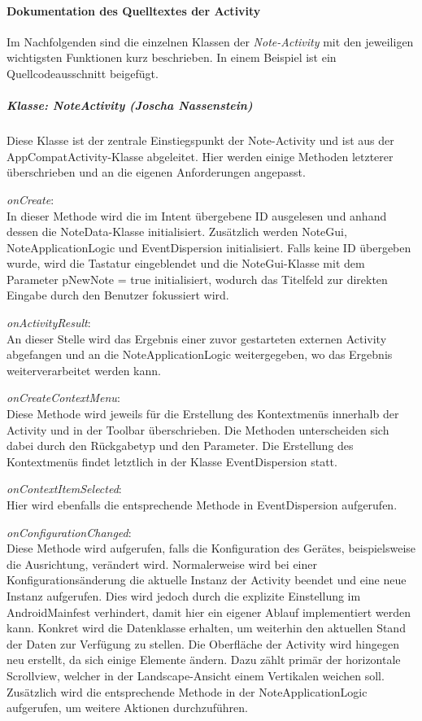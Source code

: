 \paragraph{Dokumentation des Quelltextes der Activity}
Im Nachfolgenden sind die einzelnen Klassen der \textit{Note-Activity} mit den jeweiligen wichtigsten Funktionen kurz beschrieben. In einem Beispiel ist ein Quellcodeausschnitt beigefügt.
\subparagraph{Klasse: NoteActivity (Joscha Nassenstein)}
Diese Klasse ist der zentrale Einstiegspunkt der Note-Activity und ist aus der AppCompatActivity-Klasse abgeleitet. Hier werden einige Methoden letzterer überschrieben und an die eigenen Anforderungen angepasst.

\textit{onCreate}:\\
In dieser Methode wird die im Intent übergebene ID ausgelesen und anhand dessen die NoteData-Klasse initialisiert. Zusätzlich werden NoteGui, NoteApplicationLogic und EventDispersion initialisiert. Falls keine ID übergeben wurde, wird die Tastatur eingeblendet und die NoteGui-Klasse mit dem Parameter pNewNote = true initialisiert, wodurch das Titelfeld zur direkten Eingabe durch den Benutzer fokussiert wird.

\textit{onActivityResult}:\\
An dieser Stelle wird das Ergebnis einer zuvor gestarteten externen Activity abgefangen und an die NoteApplicationLogic weitergegeben, wo das Ergebnis weiterverarbeitet werden kann.

\textit{onCreateContextMenu}:\\
Diese Methode wird jeweils für die Erstellung des Kontextmenüs innerhalb der Activity und in der Toolbar überschrieben. Die Methoden unterscheiden sich dabei durch den Rückgabetyp und den Parameter. Die Erstellung des Kontextmenüs findet letztlich in der Klasse EventDispersion statt.

\textit{onContextItemSelected}:\\
Hier wird ebenfalls die entsprechende Methode in EventDispersion aufgerufen.

\textit{onConfigurationChanged}:\\
Diese Methode wird aufgerufen, falls die Konfiguration des Gerätes, beispielsweise die Ausrichtung, verändert wird. Normalerweise wird bei einer Konfigurationsänderung die aktuelle Instanz der Activity beendet und eine neue Instanz aufgerufen. Dies wird jedoch durch die explizite  Einstellung im AndroidMainfest verhindert, damit hier ein eigener Ablauf implementiert werden kann. Konkret wird die Datenklasse erhalten, um weiterhin den aktuellen Stand der Daten zur Verfügung zu stellen. Die Oberfläche der Activity wird hingegen neu erstellt, da sich einige Elemente ändern. Dazu zählt primär der horizontale Scrollview, welcher in der Landscape-Ansicht einem Vertikalen weichen soll. Zusätzlich wird die entsprechende Methode in der NoteApplicationLogic aufgerufen, um weitere Aktionen durchzuführen.

